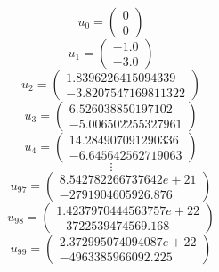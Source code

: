 \documentclass[varwidth,margin=1in]{standalone}
\begin{document}
\[ u_{0} = \left(\begin{matrix} 0 \\ 0 \end{matrix}\right) \]
\[ u_{1} = \left(\begin{matrix} -1.0 \\ -3.0 \end{matrix}\right) \]
\[ u_{2} = \left(\begin{matrix} 1.8396226415094339 \\ -3.8207547169811322 \end{matrix}\right) \]
\[ u_{3} = \left(\begin{matrix} 6.526038850197102 \\ -5.006502255327961 \end{matrix}\right) \]
\[ u_{4} = \left(\begin{matrix} 14.284907091290336 \\ -6.645642562719063 \end{matrix}\right) \]
\[\vdots\]
\[ u_{97} = \left(\begin{matrix} 8.542782266737642e+21 \\ -2791904605926.876 \end{matrix}\right) \]
\[ u_{98} = \left(\begin{matrix} 1.4237970444563757e+22 \\ -3722539474569.168 \end{matrix}\right) \]
\[ u_{99} = \left(\begin{matrix} 2.372995074094087e+22 \\ -4963385966092.225 \end{matrix}\right) \]
\end{document}
